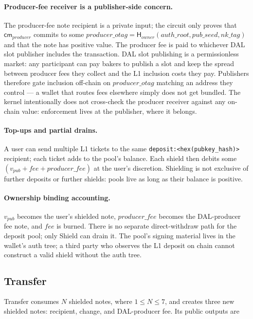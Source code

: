 \documentclass[11pt]{article}
\newcommand{\Hash}{\mathsf{H}}
\newcommand{\cm}{\mathsf{cm}}
\begin{document}
\paragraph{Producer-fee receiver is a publisher-side concern.} The
producer-fee note recipient is a private input; the circuit only proves
that \(\cm_{producer}\) commits to some
\(producer\_otag = \Hash_{owner}(auth\_root, pub\_seed, nk\_tag)\) and
that the note has positive value. The producer fee is paid to whichever
DAL slot publisher includes the transaction. DAL slot publishing is a
permissionless market: any participant can pay bakers to publish a slot
and keep the spread between producer fees they collect and the L1
inclusion costs they pay. Publishers therefore gate inclusion off-chain
on \(producer\_otag\) matching an address they control — a wallet that
routes fees elsewhere simply does not get bundled. The kernel
intentionally does not cross-check the producer receiver against any
on-chain value: enforcement lives at the publisher, where it belongs.

\paragraph{Top-ups and partial drains.} A user can send multiple L1
tickets to the same \texttt{deposit:<hex(pubkey\_hash)>} recipient; each
ticket adds to the pool's balance. Each shield then debits some
\((v_{pub} + fee + producer\_fee)\) at the user's discretion. Shielding
is not exclusive of further deposits or further shields: pools live as
long as their balance is positive.

\paragraph{Ownership binding accounting.} \(v_{pub}\) becomes the user's
shielded note, \(producer\_fee\) becomes the DAL-producer fee note, and
\(fee\) is burned. There is no separate direct-withdraw path for the
deposit pool; only Shield can drain it. The pool's signing material
lives in the wallet's auth tree; a third party who observes the L1
deposit on chain cannot construct a valid shield without the auth tree.

\subsection{Transfer}

Transfer consumes \(N\) shielded notes, where \(1 \leq N \leq 7\), and creates
three new shielded notes: recipient, change, and DAL-producer fee. Its public
outputs are
\end{document}
